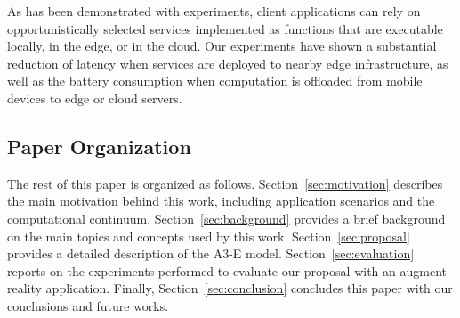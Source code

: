 As has been demonstrated with experiments, client applications can rely on opportunistically selected services implemented as functions that are executable locally, in the edge, or in the cloud. Our experiments have shown a substantial reduction of latency when services are deployed to nearby edge infrastructure, as well as the battery consumption when computation is offloaded from mobile devices to edge or cloud servers.


\subsection{Paper Organization}

The rest of this paper is organized as follows. Section~\ref{sec:motivation} describes the main motivation behind this work, including application scenarios and the computational continuum. Section~\ref{sec:background} provides a brief background on the main topics and concepts used by this work. Section~\ref{sec:proposal} provides a detailed description of the A3-E model. Section~\ref{sec:evaluation} reports on the experiments performed to evaluate our proposal with an augment reality application. Finally, Section~\ref{sec:conclusion} concludes this paper with our conclusions and future works.




